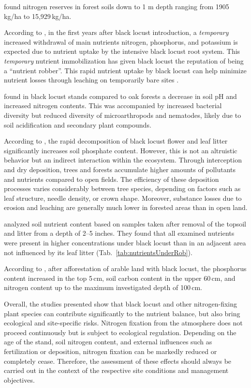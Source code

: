 \citet{emberger1965stickstoff} found nitrogen reserves in forest soils down to 1 m depth ranging from 1905\,kg/ha to 15,929\,kg/ha.

According to \citet{mueller1991robinie}, in the first years after black locust introduction, a \emph{temporary} increased withdrawal of main nutrients nitrogen, phosphorus, and potassium is expected due to nutrient uptake by the intensive black locust root system. This \emph{temporary} nutrient immobilization has given black locust the reputation of being a \enquote{nutrient robber}.
This rapid nutrient uptake by black locust can help minimize nutrient losses through leaching on temporarily bare sites \citep{boring1984robinie}.

\citet{lazzaro2018robinie} found in black locust stands compared to oak forests a decrease in soil pH and increased nitrogen contents. This was accompanied by increased bacterial diversity but reduced diversity of microarthropods and nematodes, likely due to soil acidification and secondary plant compounds.

According to \citet{lee2010robinie}, the rapid decomposition of black locust flower and leaf litter significantly increases soil phosphate content. However, this is not an altruistic behavior but an indirect interaction within the ecosystem. Through interception and dry deposition, trees and forests accumulate higher amounts of pollutants and nutrients compared to open fields. The efficiency of these deposition processes varies considerably between tree species, depending on factors such as leaf structure, needle density, or crown shape. Moreover, substance losses due to erosion and leaching are generally much lower in forested areas than in open land.

\citet{garman1938robinie} analyzed soil nutrient content based on samples taken after removal of the topsoil and litter from a depth of 2–5 inches. They found that all examined nutrients were present in higher concentrations under black locust than in an adjacent area not influenced by its leaf litter (Tab.~\ref{tab:nutrientsUnderRob}).


According to \citet{kou2016robinieBoden}, after afforestation of arable land with black locust, the phosphorus content increased in the top 5\,cm, soil carbon content in the upper 60\,cm, and nitrogen content up to the maximum investigated depth of 100\,cm.

Overall, the studies presented show that black locust and other nitrogen-fixing plant species can contribute significantly to the nutrient balance, but also bring ecological and site-specific risks. Nitrogen fixation from the atmosphere does not proceed continuously but is subject to ecological regulation. Depending on the age of the stand, soil nitrogen content, and external influences such as fertilization or deposition, nitrogen fixation can be markedly reduced or completely cease. Therefore, the assessment of these effects should always be carried out in the context of the respective site conditions and management objectives.


